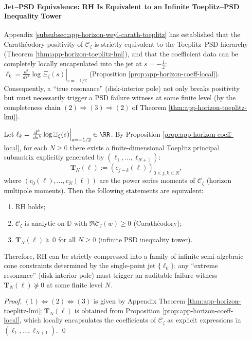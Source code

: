 \paragraph{Jet--PSD Equivalence: RH Is Equivalent to an Infinite Toeplitz--PSD Inequality Tower}
Appendix \ref{subsubsec:app-horizon-weyl-carath-toeplitz} has established that the Carath\'eodory positivity of \(\mathscr{C}_{\zeta}\) is strictly equivalent to the Toeplitz--PSD hierarchy (Theorem \ref{thm:app-horizon-toeplitz-lmi}), and that the coefficient data can be completely locally encapsulated into the jet at \(s=-\tfrac12\):
\(\ell_k=\left.\frac{d^k}{ds^k}\log\Xi_{\zeta}(s)\right|_{s=-1/2}\) (Proposition \ref{prop:app-horizon-coeff-local}).
Consequently, a ``true resonance'' (disk-interior pole) not only breaks positivity but must necessarily trigger a PSD failure witness at some finite level (by the completeness chain \((2)\Rightarrow(3)\Rightarrow(2)\) of Theorem \ref{thm:app-horizon-toeplitz-lmi}).

\begin{theorem}\label{thm:xi-jet-psd-equivalence}
Let \(\ell_k=\left.\frac{d^k}{ds^k}\log\Xi_{\zeta}(s)\right|_{s=-1/2}\in\RR\).
By Proposition \ref{prop:app-horizon-coeff-local}, for each \(N\ge 0\) there exists a finite-dimensional Toeplitz principal submatrix explicitly generated by \((\ell_1,\dots,\ell_{N+1})\):
\[
\mathbf{T}_N(\ell):=(c_{j-k}(\ell))_{0\le j,k\le N},
\]
where \((c_0(\ell),\dots,c_N(\ell))\) are the power series moments of \(\mathscr{C}_{\zeta}\) (horizon multipole moments).
Then the following statements are equivalent:
\begin{enumerate}
  \item RH holds;
  \item \(\mathscr{C}_{\zeta}\) is analytic on \(\mathbb{D}\) with \(\Re\mathscr{C}_{\zeta}(w)\ge 0\) (Carath\'eodory);
  \item \(\mathbf{T}_N(\ell)\succeq 0\) for all \(N\ge 0\) (infinite PSD inequality tower).
\end{enumerate}
Therefore, RH can be strictly compressed into a family of infinite semi-algebraic cone constraints determined by the single-point jet \(\{\ell_k\}\); any ``extreme resonance'' (disk-interior pole) must trigger an auditable failure witness \(\mathbf{T}_N(\ell)\nsucceq 0\) at some finite level \(N\).
\end{theorem}

\begin{proof}
\((1)\Leftrightarrow(2)\Leftrightarrow(3)\) is given by Appendix Theorem \ref{thm:app-horizon-toeplitz-lmi};
\(\mathbf{T}_N(\ell)\) is obtained from Proposition \ref{prop:app-horizon-coeff-local}, which locally encapsulates the coefficients of \(\mathscr{C}_{\zeta}\) as explicit expressions in \((\ell_1,\dots,\ell_{N+1})\). \qed
\end{proof}

